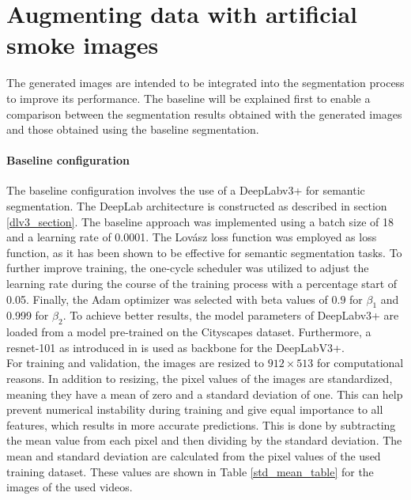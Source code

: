 \FloatBarrier
\section{Augmenting data with artificial smoke images}\label{experiment_enhance1}
The generated images are intended to be integrated into the segmentation process to improve its performance.
The baseline will be explained first to enable a comparison between the segmentation results obtained with the generated images and those obtained using the baseline segmentation.
\paragraph{Baseline configuration} The baseline configuration involves the use of a DeepLabv3+ for semantic segmentation.
The DeepLab architecture is constructed as described in section \ref{dlv3_section}.
The baseline approach was implemented using a batch size of 18 and a learning rate of 0.0001.
The Lovász loss function was employed as loss function, as it has been shown to be effective for semantic segmentation tasks.
To further improve training, the one-cycle scheduler was utilized to adjust the learning rate during the course of the training process with a percentage start of 0.05.
Finally, the Adam optimizer was selected with beta values of $0.9$ for $\beta_1$ and 0.999 for $\beta_2 $.
To achieve better results, the model parameters of DeepLabv3+ are loaded from a model pre-trained on the Cityscapes \cite{cordts2016cityscapes} dataset.
Furthermore, a resnet-101 as introduced in \cite{He2015} is used as backbone for the DeepLabV3+.\\
For training and validation, the images are resized to $912\times513$ for computational reasons.
In addition to resizing, the pixel values of the images are standardized, meaning they have a mean of zero and a standard deviation of one.
This can help prevent numerical instability during training and give equal importance to all features, which results in more accurate predictions.%
This is done by subtracting the mean value from each pixel and then dividing by the standard deviation. 
The mean and standard deviation are calculated from the pixel values of the used training dataset.
These values are shown in Table \ref{std_mean_table} for the images of the used videos.\\
